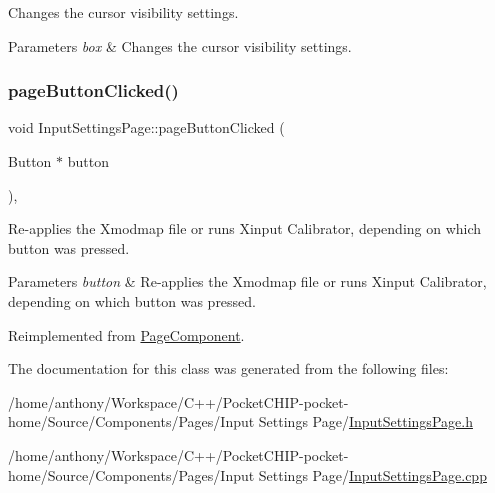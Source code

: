 Changes the cursor visibility settings.


\begin{DoxyParams}{Parameters}
{\em box} & Changes the cursor visibility settings. \\
\hline
\end{DoxyParams}
\mbox{\label{classInputSettingsPage_a89fcfdf1adb1d8a7a1ba03a2325d72f2}} 
\subsubsection{\texorpdfstring{page\+Button\+Clicked()}{pageButtonClicked()}}
{\footnotesize\ttfamily void Input\+Settings\+Page\+::page\+Button\+Clicked (\begin{DoxyParamCaption}\item[{Button $\ast$}]{button }\end{DoxyParamCaption})\hspace{0.3cm}{\ttfamily [override]}, {\ttfamily [virtual]}}

Re-\/applies the Xmodmap file or runs Xinput Calibrator, depending on which button was pressed.


\begin{DoxyParams}{Parameters}
{\em button} & Re-\/applies the Xmodmap file or runs Xinput Calibrator, depending on which button was pressed. \\
\hline
\end{DoxyParams}


Reimplemented from \mbox{\hyperlink{classPageComponent_a048ad03d61031e4e89ffed12916db9ae}{Page\+Component}}.



The documentation for this class was generated from the following files\+:\begin{DoxyCompactItemize}
\item 
/home/anthony/\+Workspace/\+C++/\+Pocket\+C\+H\+I\+P-\/pocket-\/home/\+Source/\+Components/\+Pages/\+Input Settings Page/\mbox{\hyperlink{InputSettingsPage_8h}{Input\+Settings\+Page.\+h}}\item 
/home/anthony/\+Workspace/\+C++/\+Pocket\+C\+H\+I\+P-\/pocket-\/home/\+Source/\+Components/\+Pages/\+Input Settings Page/\mbox{\hyperlink{InputSettingsPage_8cpp}{Input\+Settings\+Page.\+cpp}}\end{DoxyCompactItemize}
